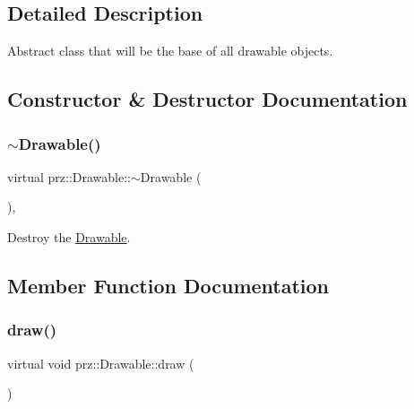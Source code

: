 \subsection{Detailed Description}
Abstract class that will be the base of all drawable objects. 



\subsection{Constructor \& Destructor Documentation}
\mbox{\label{classprz_1_1_drawable_a6fbba7cb0aae98e2b777e86897c3512b}} 
\subsubsection{\texorpdfstring{$\sim$Drawable()}{~Drawable()}}
{\footnotesize\ttfamily virtual prz\+::\+Drawable\+::$\sim$\+Drawable (\begin{DoxyParamCaption}{ }\end{DoxyParamCaption})\hspace{0.3cm}{\ttfamily [virtual]}, {\ttfamily [default]}}



Destroy the \mbox{\hyperlink{classprz_1_1_drawable}{Drawable}}. 



\subsection{Member Function Documentation}
\mbox{\label{classprz_1_1_drawable_aa6ca0ce45d4a00b69ecf47d5deb23825}} 
\subsubsection{\texorpdfstring{draw()}{draw()}\hspace{0.1cm}{\footnotesize\ttfamily [1/2]}}
{\footnotesize\ttfamily virtual void prz\+::\+Drawable\+::draw (\begin{DoxyParamCaption}{ }\end{DoxyParamCaption})\hspace{0.3cm}{\ttfamily [pure virtual]}}



